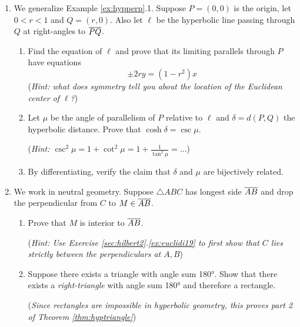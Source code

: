 \begin{exercises}
\begin{enumerate}
	    
		\item\label{exs:angparallelism} 
		We generalize Example \ref{ex:hypperp}.1. Suppose $P=(0,0)$ is the origin, let $0<r<1$ and $Q=(r,0)$. Also let $\ell$ be the hyperbolic line passing through $Q$ at right-angles to $\overline{PQ}$.
	  \begin{enumerate}
	    \item Find the equation of $\ell$ and prove that its limiting parallels through $P$ have equations
	    \[
	    	\pm 2ry=(1-r^2)x
	    \]
	    (\emph{Hint: what does symmetry tell you about the location of the Euclidean center of $\ell$?})
	    \item Let $\mu$ be the angle of parallelism of $P$ relative to $\ell$ and $\delta=d(P,Q)$ the hyperbolic distance. Prove that $\cosh\delta=\csc\mu$.\par
	    (\emph{Hint: $\csc^2\!\mu=1+\cot^2\!\mu=1+\frac 1{\tan^2\!\mu}=\ldots$})
	    \item By differentiating, verify the claim that $\delta$ and $\mu$ are bijectively related.
	  \end{enumerate}
	  
	  \item\label{exs:triless180} We work in neutral geometry. Suppose $\triangle ABC$ has longest side $\overline{AB}$ and drop the perpendicular from $C$ to $M\in\overline{AB}$.
	  \begin{enumerate}
	    \item Prove that $M$ is interior to $\overline{AB}$.\par
	    (\emph{Hint: Use Exercise \ref*{sec:hilbert2}.\ref{ex:euclidi19} to first show that $C$ lies strictly between the perpendiculars at $A,B$})
	    \item Suppose there exists a triangle with angle sum \ang{180}. Show that there exists a \emph{right-triangle} with angle sum \ang{180} and therefore a rectangle.\par
	  	(\emph{Since rectangles are impossible in hyperbolic geometry, this proves part 2 of Theorem \ref{thm:hyptriangle}})
	 	\end{enumerate}

	  
	  

\end{enumerate}
\end{exercises}
